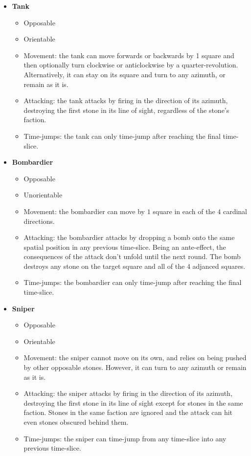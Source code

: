 \documentclass[12pt]{article}
\begin{document}
	\begin{itemize}
	\item \textbf{Tank}
		\begin{itemize}
		\item Opposable
		\item Orientable
		\item Movement: the tank can move forwards or backwards by 1 square and then optionally turn clockwise or anticlockwise by a quarter-revolution. Alternatively, it can stay on its square and turn to any azimuth, or remain as it is.
		\item Attacking: the tank attacks by firing in the direction of its azimuth, destroying the first stone in its line of sight, regardless of the stone's faction.
		\item Time-jumps: the tank can only time-jump after reaching the final time-slice.
		\end{itemize}
	\item \textbf{Bombardier}
		\begin{itemize}
		\item Opposable
		\item Unorientable
		\item Movement: the bombardier can move by $1$ square in each of the $4$ cardinal directions.
		\item Attacking: the bombardier attacks by dropping a bomb onto the same spatial position in any previous time-slice. Being an ante-effect, the consequences of the attack don't unfold until the next round. The bomb destroys any stone on the target square and all of the $4$ adjanced squares.
		\item Time-jumps: the bombardier can only time-jump after reaching the final time-slice.
		\end{itemize}
	\item \textbf{Sniper}
		\begin{itemize}
		\item Opposable
		\item Orientable
		\item Movement: the sniper cannot move on its own, and relies on being pushed by other opposable stones. However, it can turn to any azimuth or remain as it is.
		\item Attacking: the sniper attacks by firing in the direction of its azimuth, destroying the first stone in its line of sight except for stones in the same faction. Stones in the same faction are ignored and the attack can hit even stones obscured behind them.
		\item Time-jumps: the sniper can time-jump from any time-slice into any previous time-slice.

\end{itemize}
\end{itemize}
\end{document}
